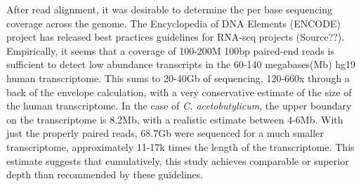 \begin{table}
{}
\end{table}
\restoregeometry




After read alignment, it was desirable to determine the per base sequencing coverage across the genome.  The Encyclopedia of DNA Elements (ENCODE) project has released best practices guidelines for RNA-seq projects (Source??). Empirically, it seems that a coverage of 100-200M 100bp paired-end reads is sufficient to detect low abundance transcripts in the 60-140 megabases(Mb) hg19 human transcriptome. This sums to 20-40Gb of sequencing, 120-660x through a back of the envelope calculation, with a very conservative estimate of the size of the human transcriptome. In the case of \textit{C. acetobutylicum}, the upper boundary on the transcriptome is 8.2Mb, with a realistic estimate between 4-6Mb. With just the properly paired reads, 68.7Gb were sequenced for a much smaller transcriptome, approximately 11-17k times the length of the transcriptome. This estimate suggests that cumulatively, this study achieves comparable or superior depth than recommended by these guidelines. 

